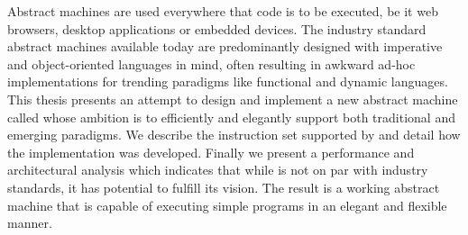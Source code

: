 Abstract machines are used everywhere that code is to be executed, be it web
browsers, desktop applications or embedded devices. The industry standard
abstract machines available today are predominantly designed with imperative and
object-oriented languages in mind, often resulting in awkward ad-hoc
implementations for trending paradigms like functional and dynamic
languages. This thesis presents an attempt to design and implement a new
abstract machine called \thename{} whose ambition is to efficiently and
elegantly support both traditional and emerging paradigms. We describe the
instruction set supported by \thename{} and detail how the implementation was
developed. Finally we present a performance and architectural analysis which
indicates that while \thename{} is not on par with industry standards, it has
potential to fulfill its vision. The result is a working abstract machine that
is capable of executing simple programs in an elegant and flexible manner.

